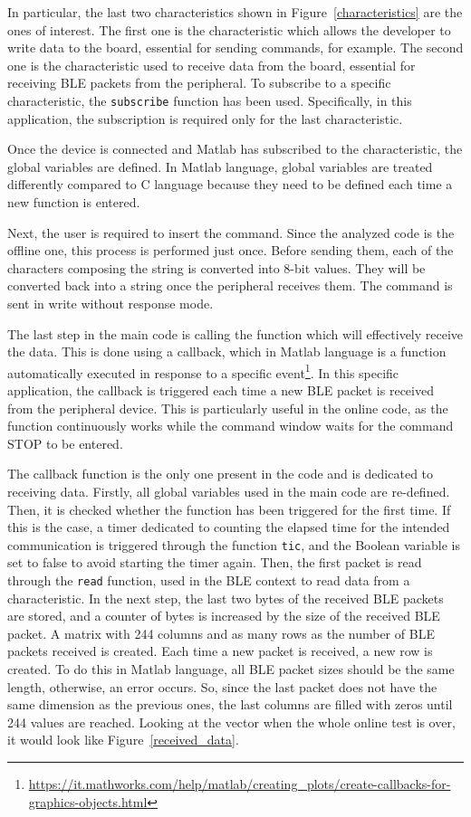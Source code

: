 \documentclass{Configuration_Files/PoliMi3i_thesis}
\begin{document}
In particular, the last two characteristics shown in Figure~\ref{characteristics} are the ones of interest. The first one is the characteristic which allows the developer to write data to the board, essential for sending commands, for example. The second one is the characteristic used to receive data from the board, essential for receiving BLE packets from the peripheral. To subscribe to a specific characteristic, the \texttt{subscribe} function has been used. Specifically, in this application, the subscription is required only for the last characteristic.

Once the device is connected and Matlab has subscribed to the characteristic, the global variables are defined. In Matlab language, global variables are treated differently compared to C language because they need to be defined each time a new function is entered.

Next, the user is required to insert the command. Since the analyzed code is the offline one, this process is performed just once. Before sending them, each of the characters composing the string is converted into 8-bit values. They will be converted back into a string once the peripheral receives them. The command is sent in write without response mode.

The last step in the main code is calling the function which will effectively receive the data. This is done using a callback, which in Matlab language is a function automatically executed in response to a specific event\footnote{\url{https://it.mathworks.com/help/matlab/creating_plots/create-callbacks-for-graphics-objects.html}}. In this specific application, the callback is triggered each time a new BLE packet is received from the peripheral device. This is particularly useful in the online code, as the function continuously works while the command window waits for the command STOP to be entered.

The callback function is the only one present in the code and is dedicated to receiving data. Firstly, all global variables used in the main code are re-defined. Then, it is checked whether the function has been triggered for the first time. If this is the case, a timer dedicated to counting the elapsed time for the intended communication is triggered through the function \texttt{tic}, and the Boolean variable is set to false to avoid starting the timer again. Then, the first packet is read through the \texttt{read} function, used in the BLE context to read data from a characteristic. In the next step, the last two bytes of the received BLE packets are stored, and a counter of bytes is increased by the size of the received BLE packet. A matrix with 244 columns and as many rows as the number of BLE packets received is created. Each time a new packet is received, a new row is created. To do this in Matlab language, all BLE packet sizes should be the same length, otherwise, an error occurs. So, since the last packet does not have the same dimension as the previous ones, the last columns are filled with zeros until 244 values are reached. Looking at the vector when the whole online test is over, it would look like Figure~\ref{received_data}.
\end{document}
